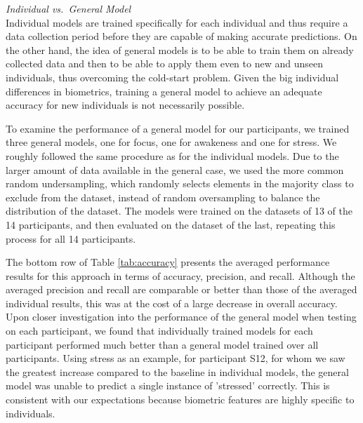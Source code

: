 \noindent\textit{Individual vs.\ General Model}\\
Individual models are trained specifically for each individual and thus require a data collection period before they are capable of making accurate predictions. On the other hand, the idea of general models is to be able to train them on already collected data and then  to be able to apply them even to new and unseen individuals, thus overcoming the cold-start problem. Given the big individual differences in biometrics, training a general model to achieve an adequate accuracy for new individuals is not necessarily possible. 

To examine the performance of a general model for our participants, we trained three general models, one for focus, one for awakeness and one for stress. We roughly followed the same procedure as for the individual models. Due to the larger amount of data available in the general case, we used the more common random undersampling, which randomly selects elements in the majority class to exclude from the dataset, instead of random oversampling to balance the distribution of the dataset. The models were trained on the datasets of 13 of the 14 participants, and then evaluated on the dataset of the last, repeating this process for all 14 participants. 

The bottom row of Table \ref{tab:accuracy} presents the averaged performance results for this approach in terms of accuracy, precision, and recall. Although the averaged precision and recall are comparable or better than those of the averaged individual results, this was at the cost of a large decrease in overall accuracy. Upon closer investigation into the performance of the general model when testing on each participant, we found that individually trained models for each participant performed much better than a general model trained over all participants. Using stress as an example, for participant S12, for whom we saw the greatest increase compared to the baseline in individual models, the general model was unable to predict a single instance of 'stressed' correctly. This is consistent with our expectations because biometric features are highly specific to individuals.




